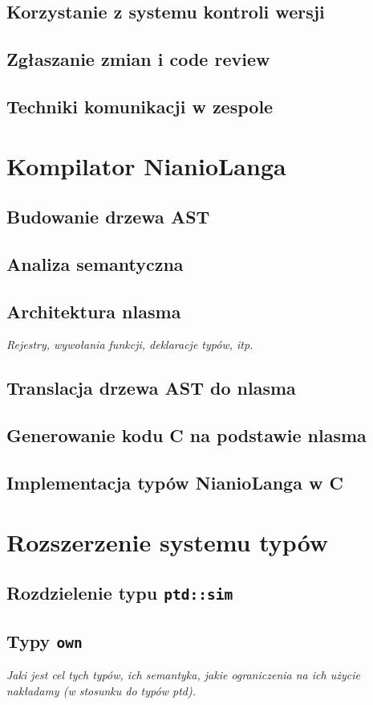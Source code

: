 \documentclass[licencjacka]{pracamgr}
\begin{document}
\section{Korzystanie z systemu kontroli wersji}
\section{Zgłaszanie zmian i code review}
\section{Techniki komunikacji w zespole}

\chapter{Kompilator NianioLanga}
\section{Budowanie drzewa AST}
\section{Analiza semantyczna}
\section{Architektura nlasma}
  \emph{Rejestry, wywołania funkcji, deklaracje typów, itp.}
\section{Translacja drzewa AST do nlasma}
\section{Generowanie kodu C na podstawie nlasma}
\section{Implementacja typów NianioLanga w C}

\chapter{Rozszerzenie systemu typów}
\section{Rozdzielenie typu \texttt{ptd::sim}}
\section{Typy \texttt{own}}
  \emph{Jaki jest cel tych typów, ich semantyka, jakie ograniczenia na ich użycie
    nakładamy (w stosunku do typów ptd).}
\end{document}
